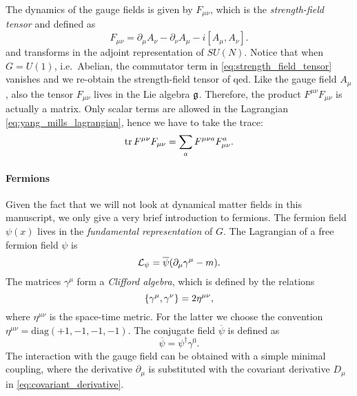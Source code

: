 The dynamics of the gauge fields is given by $F_{\mu \nu}$, which is the \emph{strength-field tensor} and defined as
\begin{equation}
    F_{\mu \nu} = \partial_{\mu} A_{\nu} - \partial_{\nu} A_{\mu} - i [A_{\mu}, A_{\nu}].
    \label{eq:strength_field_tensor}
\end{equation}
and transforms in the adjoint representation of $SU(N)$.
Notice that when $G = U(1)$, i.e.~Abelian, the commutator term in \eqref{eq:strength_field_tensor} vanishes and we re-obtain the strength-field tensor of \ac{qed}.
Like the gauge field $A_{\mu}$, also the tensor $F_{\mu \nu}$ lives in the Lie algebra $\mathfrak{g}$.
Therefore, the product $F^{\mu \nu} F_{\mu \nu}$ is actually a matrix.
Only scalar terms are allowed in the Lagrangian \eqref{eq:yang_mills_lagrangian}, hence we have to take the trace:
\begin{equation*}
    \tr F^{\mu \nu} F_{\mu \nu} = \sum_{a} F^{\mu \nu a} F_{\mu \nu}^a.
\end{equation*}



\paragraph*{Fermions}

Given the fact that we will not look at dynamical matter fields in this manuscript, we only give a very brief introduction to fermions.
The fermion field $\psi(x)$ lives in the \emph{fundamental representation} of $G$.
The Lagrangian of a free fermion field $\psi$ is
\begin{equation}
    \mathcal{L}_{\psi} = \overline{\psi} \qty( \partial_{\mu} \gamma^{\mu} - m ).
\end{equation}
The matrices $\gamma^{\mu}$ form a \emph{Clifford algebra}, which is defined by the relations
\begin{equation}
    \acomm{\gamma^{\mu}}{\gamma^{\nu}} = 2 \eta^{\mu \nu},
\end{equation}
where $\eta^{\mu \nu}$ is the space-time metric.
For the latter we choose the convention $\eta^{\mu \nu} = \mathrm{diag}(+1, -1, -1, -1)$.
The conjugate field $\overline{\psi}$ is defined as
\begin{equation*}
    \overline{\psi} = \psi^{\dagger}\gamma^0.
\end{equation*}
The interaction with the gauge field can be obtained with a simple minimal coupling, where the derivative $\partial_{\mu}$ is substituted with the covariant derivative $D_{\mu}$ in \eqref{eq:covariant_derivative}.




